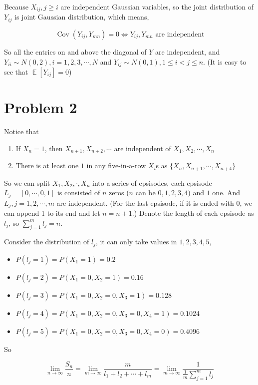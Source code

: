 \documentclass{article}
\DeclareMathOperator{\E}{\mathbb{E}}
\DeclareMathOperator{\Cov}{\operatorname{Cov}}
\begin{document}
Because $X_{ij}, j \geqslant i $ are independent Gaussian variables, so the joint distribution of $Y_{ij}$ is joint Gaussian distribution, which means,

\begin{equation}
    \Cov(Y_{ij},Y_{mn}) = 0 \Longleftrightarrow Y_{ij},Y_{mn} \text{ are independent}
\end{equation}

So all the entries on and above the diagonal of $Y$ are independent, and $Y_{ii} \sim N(0,2), i =1,2,3,\cdots,N$ and $Y_{ij} \sim N(0,1), 1\leqslant i < j \leqslant n$. (It is easy to see that $\E[Y_{ij}] = 0$)

\section{Problem 2}

Notice that \begin{enumerate}
    \item If $X_n = 1$, then $X_{n+1},X_{n+2},\cdots$ are independent of $X_{1},X_2,\cdots,X_{n}$  
    \item There is at least one $1$ in any five-in-a-row $X_i$s as $\{X_n,X_{n+1},\cdots,X_{n+4} \} $
\end{enumerate}

So we can split $X_1,X_2,\cdot,X_n$ into a series of epsisodes, each epsisode $L_j = [0,\cdots,0,1]$ is consisted of $n$ zeros ($n$ can be $0,1,2,3,4$) and $1$ one. And $L_j, j =1,2,\cdots,m$ are independent. (For the last epsisode, if it is ended with $0$, we can append 1 to its end and let $n = n+1$.) Denote the length of each epsisode as $l_j$, so $\sum_{j=1}^m l_j = n$.

Consider the distribution of $l_j$, it can only take values in $1,2,3,4,5$, \begin{itemize}
    \item $P(l_j = 1) = P(X_1=1)  = 0.2$
    \item $P(l_j = 2) = P(X_1=0,X_2 = 1)= 0.16$ 
    \item $P(l_j = 3) = P(X_1=0,X_2 = 0,X_3 = 1)= 0.128$
    \item $P(l_j = 4) = P(X_1=0,X_2 = 0,X_3 = 0,X_4=1)= 0.1024$
    \item $P(l_j = 5) = P(X_1=0,X_2 = 0,X_3 = 0,X_4=0) = 0.4096$
\end{itemize}

So 

\begin{equation}
    \lim_{n\to \infty} \frac{S_n}{ n }= \lim_{m\to \infty} \frac {m}{l_1 + l_2 + \cdots + l_m  } = \lim_{m\to \infty} \frac{1}{ \frac{1}{m} \sum_{j=1}^m l_j}
\end{equation}
\end{document}
